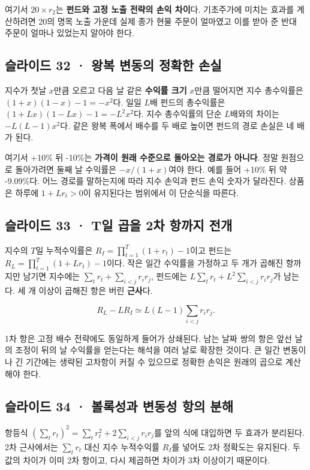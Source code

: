 \documentclass[11pt,a4paper]{article}
\begin{document}
여기서 $20\times r_2$는 \textbf{펀드와 고정 노출 전략의 손익 차이}다. 기초주가에 미치는 효과를 계산하려면 20의 명목 노출 가운데 실제 종가 현물 주문이 얼마였고 이를 받아 준 반대 주문이 얼마나 있었는지 알아야 한다.\par

\subsection{슬라이드 32 · 왕복 변동의 정확한 손실}
지수가 첫날 $x$만큼 오르고 다음 날 같은 \textbf{수익률 크기} $x$만큼 떨어지면 지수 총수익률은 $(1+x)(1-x)-1=-x^2$다. 일일 $L$배 펀드의 총수익률은 $(1+Lx)(1-Lx)-1=-L^2x^2$다. 지수 총수익률의 단순 $L$배와의 차이는 $-L(L-1)x^2$다. 같은 왕복 폭에서 배수를 두 배로 높이면 펀드의 경로 손실은 네 배가 된다.\par

여기서 +10\% 뒤 -10\%는 \textbf{가격이 원래 수준으로 돌아오는 경로가 아니다}. 정말 원점으로 돌아가려면 둘째 날 수익률은 $-x/(1+x)$여야 한다. 예를 들어 +10\% 뒤 약 -9.09\%다. 어느 경로를 말하는지에 따라 지수 손익과 펀드 손익 숫자가 달라진다. 상품은 하루에 $1+Lr_t>0$이 유지된다는 범위에서 이 단순식을 따른다.\par

\subsection{슬라이드 33 · T일 곱을 2차 항까지 전개}
지수의 $T$일 누적수익률은 $R_I=\prod_{t=1}^T(1+r_t)-1$이고 펀드는 $R_L=\prod_{t=1}^T(1+Lr_t)-1$이다. 작은 일간 수익률을 가정하고 두 개가 곱해진 항까지만 남기면 지수에는 $\sum_t r_t+\sum_{i<j}r_ir_j$, 펀드에는 $L\sum_t r_t+L^2\sum_{i<j}r_ir_j$가 남는다. 세 개 이상이 곱해진 항은 버린 \textbf{근사}다.\par

\[
R_L-LR_I\simeq L(L-1)\sum_{i<j}r_ir_j.
\]

1차 항은 고정 배수 전략에도 동일하게 들어가 상쇄된다. 남는 날짜 쌍의 항은 앞선 날의 조정이 뒤의 날 수익률을 얻는다는 해석을 여러 날로 확장한 것이다. 큰 일간 변동이나 긴 기간에는 생략된 고차항이 커질 수 있으므로 정확한 손익은 원래의 곱으로 계산해야 한다.\par

\subsection{슬라이드 34 · 볼록성과 변동성 항의 분해}
항등식 $(\sum_t r_t)^2=\sum_t r_t^2+2\sum_{i<j}r_ir_j$를 앞의 식에 대입하면 두 효과가 분리된다. 2차 근사에서는 $\sum_t r_t$ 대신 지수 누적수익률 $R_I$를 넣어도 2차 정확도는 유지된다. 두 값의 차이가 이미 2차 항이고, 다시 제곱하면 차이가 3차 이상이기 때문이다.\par
\end{document}
